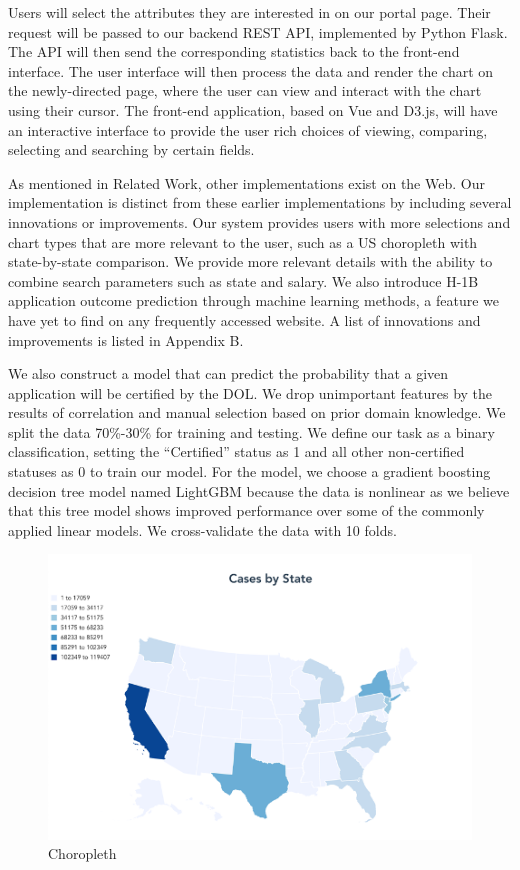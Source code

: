 \documentclass[sigconf]{acmart}
\begin{document}
Users will select the attributes they are interested in on our portal page. Their request will be passed to our 
backend REST API, implemented by Python Flask. The API will then send the corresponding statistics back to the 
front-end interface. The user interface will then process the data and render the chart on the newly-directed page, 
where the user can view and interact with the chart using their cursor. The front-end application, based on Vue and D3.js, 
will have an interactive interface to provide the user rich choices of viewing, comparing, selecting and searching by certain fields. 



As mentioned in Related Work, other implementations exist on the Web. Our implementation is distinct from these earlier 
implementations by including several innovations or improvements. Our system provides users with more selections and 
chart types that are more relevant to the user, such as a US choropleth with state-by-state comparison. 
We provide more relevant details with the ability to combine search parameters such as state and salary. 
We also introduce H-1B application outcome prediction through machine learning methods, a feature we have yet to find on 
any frequently accessed website. A list of innovations and improvements is listed in Appendix B.  


We also construct a model that can predict the probability that a given application will be certified by the DOL. 
We drop unimportant features by the results of correlation and manual selection based on prior domain knowledge. 
We split the data 70\%-30\% for training and testing. 
We define our task as a binary classification, setting the “Certified” status as 1 and all other non-certified statuses 
as 0 to train our model. For the model, we choose a gradient boosting decision tree model named LightGBM because the data 
is nonlinear as we believe that this tree model shows improved performance over some of the commonly applied linear models. 
We cross-validate the data with 10 folds. 



\begin{figure}
  \includegraphics[width=\linewidth]{fig1.png}
  \caption{Choropleth}
  \label{fig:choropleth}
\end{figure}
\end{document}
